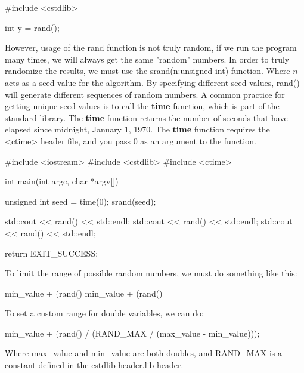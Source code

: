 \documentclass{report}
\begin{document}
    \begin{cppcode}
        #include <cstdlib>
        
        int y = rand();
    \end{cppcode}
    
    \bigbreak \noindent 
    However, usage of the rand function is not truly random, if we run the program many times, we will always get the same "random" numbers. In order to truly randomize the results, we must use the srand(n:unsigned int) function. Where $n$ acts as a seed value for the algorithm. By specifying different seed values, rand() will generate different sequences of random numbers.
    \bigbreak \noindent 
    A common practice for getting unique seed values is to call the \textbf{time} function, which is part of the standard library. The \textbf{time} function returns the number of seconds that have elapsed since midnight, January 1, 1970. The \textbf{time} function requires the <ctime> header file, and you pass 0 as an argument to the function.
    \smallbreak \noindent
    
    \begin{cppcode}
#include <iostream>
#include <cstdlib>
#include <ctime>

int main(int argc, char *argv[]){

    unsigned int seed = time(0);
    srand(seed);

    std::cout << rand() << std::endl; 
    std::cout << rand() << std::endl; 
    std::cout << rand() << std::endl; 

    return EXIT_SUCCESS;
}
    \end{cppcode}
    
    \bigbreak \noindent 
    To limit the range of possible random numbers, we must do something like this:
    \smallbreak \noindent
    
    \begin{cppcode}
min_value + (rand() %
min_value + (rand() %
    \end{cppcode}
    
    \bigbreak \noindent 
    To set a custom range for double variables, we can do:
    \bigbreak \noindent 
    
    \begin{cppcode}
min_value + (rand() / (RAND_MAX / (max_value - min_value)));
    \end{cppcode}
    
    \bigbreak \noindent 
    Where max\_value and min\_value are both doubles, and RAND\_MAX is a constant defined in the cstdlib header.lib header.
\end{document}
